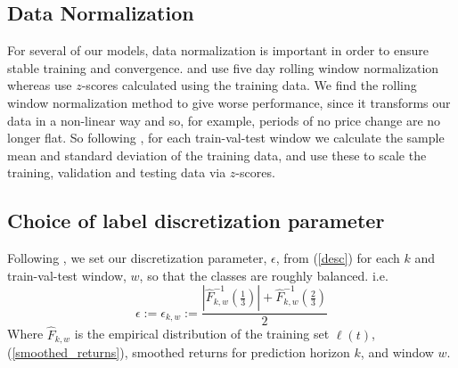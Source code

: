 \subsection{Data Normalization}
For several of our models, data normalization is important in order to ensure stable training
and convergence. \cite{LUCCHESE2024} and \cite{ZHANG2019} use five day rolling window normalization
whereas \cite{KOLM2023} use $z$-scores calculated using the training data.
We find the rolling window normalization method to give worse performance, since it transforms
our data in a non-linear way and so, for example, periods of no price change are
no longer flat. So following \cite{KOLM2023}, for each train-val-test window we calculate the 
sample mean and standard deviation of the training data, and use these to scale the training,
validation and testing data via $z$-scores.

\subsection{Choice of label discretization parameter}
Following \cite{LUCCHESE2024}, we set our discretization parameter, $\epsilon$, from (\ref{desc})
for each $k$ and train-val-test window, $w$, so that the classes are roughly balanced. i.e.
\begin{equation}
    \epsilon := \epsilon_{k, w} := \frac{|\hat{F}_{k, w}^{-1}(\frac{1}{3})| + \hat{F}_{k, w}^{-1}(\frac{2}{3})}{2}
\end{equation}
Where $\hat{F}_{k, w}$ is the empirical distribution of the training set $\ell(t)$, (\ref{smoothed_returns}), smoothed returns 
for prediction horizon $k$, and window $w$.



